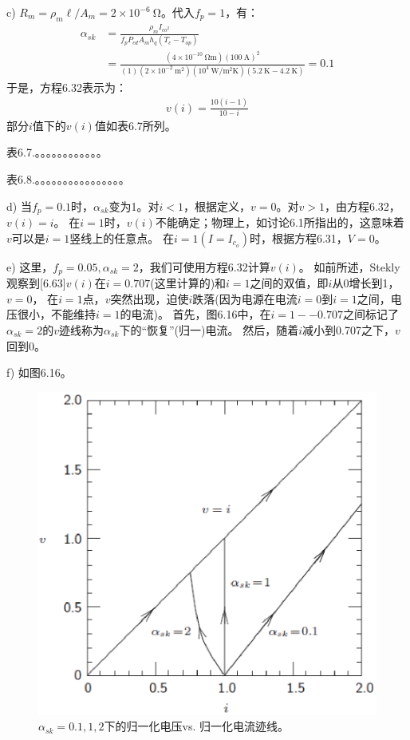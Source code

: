 c) $R_m=\rho_m \ell/A_m=2\times 10^{-6}\ \mathrm{\Omega}$。代入$f_p=1$，有：
\begin{align*}%
\alpha_{sk}&=\frac{\rho_mI_{co^2}}{f_pP_{cd}A_mh_q(T_c-T_{op})}\\
&=\frac{(4\times10^{-10}\ \mathrm{\Omega m})(100\ \mathrm{A})^2}{(1)(2\times10^{-2}\ \mathrm{m^2})(10^4\ \mathrm{W/m^2K})(5.2\ \mathrm{K}-4.2\ \mathrm{K})}=0.1
\end{align*}
于是，方程6.32表示为：
\begin{align*}%
v(i)=\frac{10(i-1)}{10-i} \tag{S5.5}
\end{align*}
部分$i$值下的$v(i)$值如表6.7所列。

表6.7.。。。。。。。。。。。。

表6.8.。。。。。。。。。。。。。。。。

d) 当$f_p=0.1$时，$\alpha_{sk}$变为1。对$i<1$，根据定义，$v=0$。对$v>1$，由方程6.32，$v(i)=i$。
在$i=1$时，$v(i)$不能确定；物理上，如讨论6.1所指出的，这意味着$v$可以是$i=1$竖线上的任意点。
在$i=1(I=I_{c_o})$时，根据方程6.31，$V=0$。

e) 这里，$f_p = 0.05,\alpha_{sk} = 2$，我们可使用方程6.32计算$v(i)$。
如前所述，Stekly观察到[6.63]$v(i)$在$i=0.707$(这里计算的)和$i= 1$之间的双值，即$i$从0增长到1，$v=0$，
在$i=1$点，$v$突然出现，迫使$i$跌落(因为电源在电流$i=0$到$i=1$之间，电压很小，不能维持$i=1$的电流)。
首先，图6.16中，在$i=1--0.707$之间标记了$\alpha_{sk}=2$的$v$迹线称为$\alpha_{sk}$下的“恢复”(归一)电流。
然后，随着$i$减小到0.707之下，$v$回到0。 

f) 如图6.16。
\begin{figure}[htbp]
	\centering
	\includegraphics[scale=0.7]{chpt6/figs/fig6.16.eps}
	\caption{$\alpha_{sk}=0.1,1,2$下的归一化电压vs. 归一化电流迹线。}
\end{figure}


